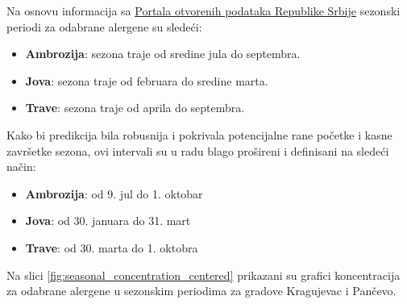 \documentclass[12pt]{article}
\begin{document}
Na osnovu informacija sa \href{https://data.gov.rs/sr/datasets/polen-objedinjeni-podatsi-od-2016-godine/}{Portala otvorenih podataka Republike Srbije} sezonski periodi za odabrane alergene su sledeći:

\begin{itemize}
    \item \textbf{Ambrozija}: sezona traje od sredine jula do septembra.
    \item \textbf{Jova}: sezona traje od februara do sredine marta.
    \item \textbf{Trave}: sezona traje od aprila do septembra.
\end{itemize}

Kako bi predikcija bila robusnija i pokrivala potencijalne rane početke i kasne završetke sezona, ovi intervali su u radu blago prošireni i definisani na sledeći način:

\begin{itemize}
    \item \textbf{Ambrozija}: od 9. jul do 1. oktobar
    \item \textbf{Jova}: od 30. januara do 31. mart
    \item \textbf{Trave}: od 30. marta do 1. oktobra
\end{itemize}

Na slici \ref{fig:seasonal_concentration_centered} prikazani su grafici koncentracija za odabrane alergene u sezonskim periodima za gradove Kragujevac i Pančevo. 
\end{document}
